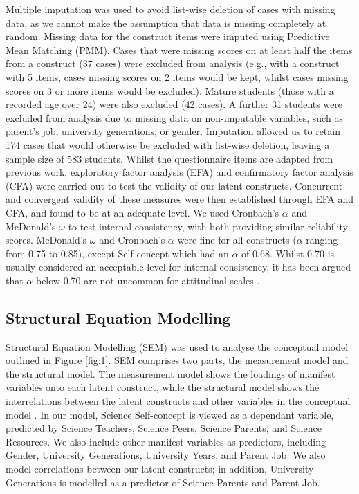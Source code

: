 Multiple imputation was used to avoid list-wise deletion of cases with missing data, as we cannot make the assumption that data is missing completely at random. Missing data for the construct items were imputed using Predictive Mean Matching (PMM). Cases that were missing scores on at least half the items from a construct (37 cases) were excluded from analysis (e.g., with a construct with 5 items, cases missing scores on 2 items would be kept, whilst cases missing scores on 3 or more items would be excluded). Mature students (those with a recorded age over 24) were also excluded (42 cases). A further 31 students were excluded from analysis due to missing data on non-imputable variables, such as parent's job, university generations, or gender. Imputation allowed us to retain 174 cases that would otherwise be excluded with list-wise deletion, leaving a  sample size of 583 students. Whilst the questionnaire items are adapted from previous work, exploratory factor analysis (EFA) and confirmatory factor analysis (CFA) were carried out to test the validity of our latent constructs. Concurrent and convergent validity \cite{campbell1959convergent} of these measures were then established through EFA and CFA, and found to be at an adequate level. We used Cronbach's $\alpha$ and McDonald's $\omega$ to test internal consistency, with both providing similar reliability scores. McDonald's $\omega$ and Cronbach's $\alpha$ were fine for all constructs ($\alpha$ ranging from 0.75 to 0.85), except Self-concept which had an $\alpha$ of 0.68. Whilst 0.70 is usually considered an acceptable level for internal consistency, it has been argued that $\alpha$ below 0.70 are not uncommon for attitudinal scales \cite{field2012discovering}. 

\subsection*{Structural Equation Modelling}
Structural Equation Modelling (SEM) was used to analyse the conceptual model outlined in Figure \ref{fig:1}. SEM comprises two parts, the measurement model and the structural model. The measurement model shows the loadings of manifest variables onto each latent construct, while the structural model shows the interrelations between the latent constructs and other variables in the conceptual model \cite{schreiber2006reporting}. In our model, Science Self-concept is viewed as a dependant variable, predicted by Science Teachers, Science Peers, Science Parents, and Science Resources. We also include other manifest variables as predictors, including Gender, University Generations, University Years, and Parent Job. We also model correlations between our latent constructs; in addition, University Generations is modelled as a predictor of Science Parents and Parent Job.

